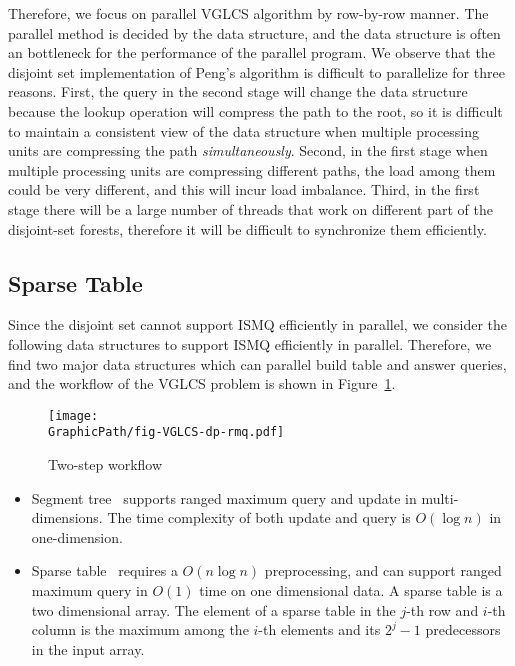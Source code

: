 

Therefore, we focus on parallel VGLCS algorithm by row-by-row manner.
The parallel method is decided by the data structure, and the data
structure is often an bottleneck for the performance of the parallel
program.  We observe that the disjoint set implementation of Peng's
algorithm is difficult to parallelize for three reasons.  First, the
query in the second stage will change the data structure because the
lookup operation will compress the path to the root, so it is difficult
to maintain a consistent view of the data structure when multiple
processing units are compressing the path {\em simultaneously}.  Second,
in the first stage when multiple processing units are compressing
different paths, the load among them could be very different, and this
will incur load imbalance. Third, in the first stage there will be a
large number of threads that work on different part of the disjoint-set
forests, therefore it will be difficult to synchronize them efficiently.

\subsection{Sparse Table}

Since the disjoint set cannot support ISMQ efficiently in parallel, we
consider the following data structures to support ISMQ efficiently in
parallel.  Therefore, we find two major data structures which can
parallel build table and answer queries, and the workflow of the VGLCS
problem is shown in Figure~\ref{fig:fig-VGLCS-dp-rmq}.


\begin{figure}
  \texttt{[image: \\GraphicPath/fig-VGLCS-dp-rmq.pdf]}
  \caption{Two-step workflow}
  \label{fig:fig-VGLCS-dp-rmq}
\end{figure}


\begin{itemize}
  \item Segment tree~\cite{berg2000computational} supports ranged
    maximum query and update in multi-dimensions.  The time complexity
    of both update and query is $O(\log n)$ in one-dimension.
  \item Sparse table~\cite{Berkman1993RecursiveSP} requires a $O(n
    \log n)$ preprocessing, and can support ranged maximum query in
    $O(1)$ time on one dimensional data.  A sparse table is a two
    dimensional array.  The element of a sparse table in the $j$-th
    row and $i$-th column is the maximum among the $i$-th elements
    and its $2^j - 1$ predecessors in the input array.
\end{itemize}

